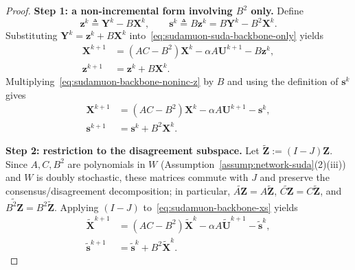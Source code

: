 \documentclass{article}
\begin{document}
\begin{proof}
\medskip\noindent\textbf{Step 1: a non-incremental form involving $B^2$ only.}
Define
\[
    \mathbf z^k \triangleq \mathbf Y^k - B\mathbf X^k,
    \qquad
    \mathbf s^k \triangleq B\mathbf z^k = B\mathbf Y^k - B^2\mathbf X^k.
\]
Substituting $\mathbf Y^k=\mathbf z^k+B\mathbf X^k$ into~\eqref{eq:sudamuon-suda-backbone-only} yields
\begin{subequations}
\label{eq:sudamuon-backbone-noninc}
\begin{align}
    \mathbf{X}^{k+1}
    &= (AC-B^2)\mathbf{X}^k - \alpha A\mathbf{U}^{k+1} - B\mathbf{z}^k,\label{eq:sudamuon-backbone-noninc-X}\\
    \mathbf{z}^{k+1}
    &= \mathbf{z}^k + B\mathbf{X}^k.\label{eq:sudamuon-backbone-noninc-z}
\end{align}
\end{subequations}
Multiplying~\eqref{eq:sudamuon-backbone-noninc-z} by $B$ and using the definition of $\mathbf s^k$ gives
\begin{subequations}
\label{eq:sudamuon-backbone-xs}
\begin{align}
\mathbf X^{k+1} &= (AC-B^2)\mathbf X^k - \alpha A\mathbf U^{k+1} - \mathbf s^k,\label{eq:sudamuon-backbone-xs-X}\\
\mathbf s^{k+1} &= \mathbf s^k + B^2\mathbf X^k.\label{eq:sudamuon-backbone-xs-s}
\end{align}
\end{subequations}

\medskip\noindent\textbf{Step 2: restriction to the disagreement subspace.}
Let $\tilde{\mathbf Z}:=(I-J)\mathbf Z$.
Since $A,C,B^2$ are polynomials in $W$ (Assumption~\ref{assump:network-suda}(2)(iii)) and $W$ is doubly stochastic,
these matrices commute with $J$ and preserve the consensus/disagreement decomposition; in particular,
$\widetilde{A\mathbf Z}=A\tilde{\mathbf Z}$, $\widetilde{C\mathbf Z}=C\tilde{\mathbf Z}$, and $\widetilde{B^2\mathbf Z}=B^2\tilde{\mathbf Z}$.
Applying $(I-J)$ to~\eqref{eq:sudamuon-backbone-xs} yields
\begin{subequations}
\label{eq:sudamuon-backbone-xs-tilde}
\begin{align}
\tilde{\mathbf X}^{k+1} &= (AC-B^2)\tilde{\mathbf X}^k - \alpha A\tilde{\mathbf U}^{k+1} - \tilde{\mathbf s}^k,\\
\tilde{\mathbf s}^{k+1} &= \tilde{\mathbf s}^k + B^2\tilde{\mathbf X}^k.
\end{align}
\end{subequations}


\end{proof}
\end{document}
